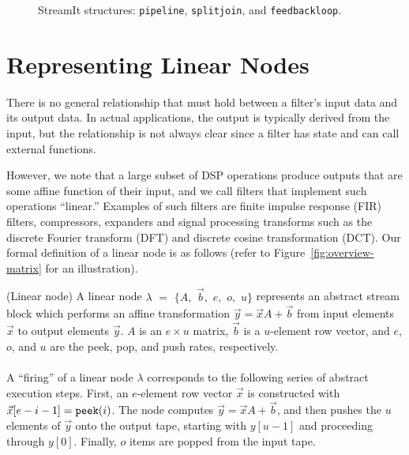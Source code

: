 \begin{figure}[t]
\vspace{-6pt}
\center
\epsfxsize=3.0in
\vspace{-12pt}
\caption{StreamIt structures: {\tt pipeline}, {\tt splitjoin}, and {\tt feedbackloop}.
\protect\label{fig:structures}}
\vspace{-12pt}
\end{figure}

\section{Representing Linear Nodes}
\label{sec:linearrep}

There is no general relationship that must hold between a
filter's input data and its output data. In actual applications, the
output is typically derived from the input, but the relationship is
not always clear since a filter has state and can call external
functions.

However, we note that a large subset of DSP operations produce outputs
that are some affine function of their input, and we call
filters that implement such operations ``linear.''  Examples of such
filters are finite impulse response (FIR) filters, compressors,
expanders and signal processing transforms such as the discrete
Fourier transform (DFT) and discrete cosine transformation (DCT).  Our
formal definition of a linear node is as follows (refer to
Figure~\ref{fig:overview-matrix} for an illustration). \vspace{-4pt}
\begin{definition}(Linear node)
A linear node $\lambda$ $=$ $\{A,$ $\vec{b},$ $e,$ $o,$ $u\}$
represents an abstract stream block which performs an affine
transformation $\vec{y} = \vec{x} A + \vec{b}$ from input elements 
$\vec{x}$ to output elements $\vec{y}$. $A$ is an $e \times u$ matrix, $\vec{b}$ is a
$u$-element row vector, and $e$, $o$, and $u$ are the peek, pop, and
push rates, respectively. \\ ~ \vspace{-8pt} \\

A ``firing'' of a linear node $\lambda$ corresponds to the following
series of abstract execution steps.  First, an $e$-element row vector
$\vec{x}$ is constructed with $\vec{x}[e-i-1] = \mbox{\tt peek}(i)$.  The node
computes $\vec{y} = \vec{x} A + {\vec b}$, and then pushes the $u$ elements 
of $\vec{y}$ onto the output tape, starting with $y[u-1]$ and proceeding through $y[0]$.
Finally, $o$ items are popped from the input tape.
\end{definition} \vspace{-2pt}

